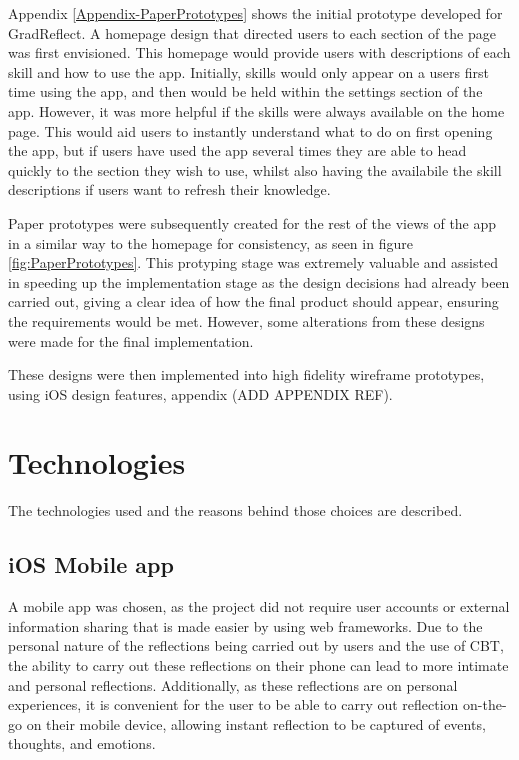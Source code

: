 \documentclass{l4proj}
\begin{document}
Appendix \ref{Appendix-PaperPrototypes} shows the initial prototype developed for GradReflect. A homepage design that directed users to each section of the page was first envisioned. This homepage would provide users with descriptions of each skill and how to use the app. Initially, skills would only appear on a users first time using the app, and then would be held within the settings section of the app. However, it was more helpful if the skills were always available on the home page. This would aid users to instantly understand what to do on first opening the app, but if users have used the app several times they are able to head quickly to the section they wish to use, whilst also having the availabile the skill descriptions if users want to refresh their knowledge. 

Paper prototypes were subsequently created for the rest of the views of the app in a similar way to the homepage for consistency, as seen in figure \ref{fig:PaperPrototypes}. This protyping stage was extremely valuable and assisted in speeding up the implementation stage as the design decisions had already been carried out, giving a clear idea of how the final product should appear, ensuring the requirements would be met. However, some alterations from these designs were made for the final implementation.

These designs were then implemented into high fidelity wireframe prototypes, using iOS design features, appendix (ADD APPENDIX REF).



\section{Technologies}

The technologies used and the reasons behind those choices are described.

\subsection{iOS Mobile app}

A mobile app was chosen, as the project did not require user accounts or external information sharing that is made easier by using web frameworks. Due to the personal nature of the reflections being carried out by users and the use of CBT, the ability to carry out these reflections on their phone can lead to more intimate and personal reflections. Additionally, as these reflections are on personal experiences, it is convenient for the user to be able to carry out reflection on-the-go on their mobile device, allowing instant reflection to be captured of events, thoughts, and emotions. 
\end{document}
